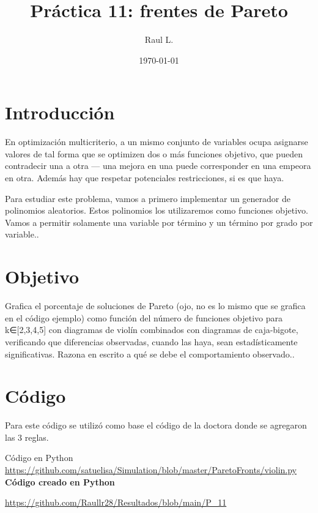 \documentclass{article}
\author{Raul L.} %
\title{Pr\'{a}ctica 11: frentes de Pareto} %
\date{\today}
\begin{document}

\maketitle %


\section{Introducci\'{o}n}\label{intro} %
En optimización multicriterio, a un mismo conjunto de variables ocupa asignarse valores de tal forma que se optimizen dos o más funciones objetivo, que pueden contradecir una a otra — una mejora en una puede corresponder en una empeora en otra. Además hay que respetar potenciales restricciones, si es que haya.

Para estudiar este problema, vamos a primero implementar un generador de polinomios aleatorios. Estos polinomios los utilizaremos como funciones objetivo. Vamos a permitir solamente una variable por término y un término por grado por variable.\citep{2}.


\section{Objetivo}
Grafica el porcentaje de soluciones de Pareto (ojo, no es lo mismo que se grafica en el código ejemplo) como función del número de funciones objetivo para k∈[2,3,4,5] con diagramas de violín combinados con diagramas de caja-bigote, verificando que diferencias observadas, cuando las haya, sean estadísticamente significativas. Razona en escrito a qué se debe el comportamiento observado.\citep{2}.


\section{C\'{o}digo}
Para este código se utilizó como base el código de la doctora donde se agregaron las 3 reglas.


 Código en Python 
\url{https://github.com/satuelisa/Simulation/blob/master/ParetoFronts/violin.py}
\newpage
{\bf Código creado en Python}

\url{https://github.com/Raullr28/Resultados/blob/main/P_11}

\renewcommand{\listingscaption}{Código}
\end{document}
